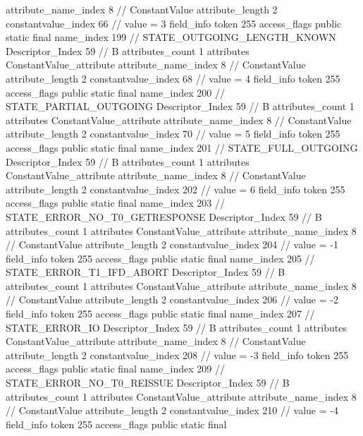 {{{{{{{					attribute_name_index	8		// ConstantValue
					attribute_length	2
					constantvalue_index	66		// value = 3
				}
				}
			}
			field_info {
				token	255
				access_flags	public static final
				name_index	199		// STATE_OUTGOING_LENGTH_KNOWN
				Descriptor_Index	59		// B
				attributes_count	1
				attributes {
				ConstantValue_attribute {
					attribute_name_index	8		// ConstantValue
					attribute_length	2
					constantvalue_index	68		// value = 4
				}
				}
			}
			field_info {
				token	255
				access_flags	public static final
				name_index	200		// STATE_PARTIAL_OUTGOING
				Descriptor_Index	59		// B
				attributes_count	1
				attributes {
				ConstantValue_attribute {
					attribute_name_index	8		// ConstantValue
					attribute_length	2
					constantvalue_index	70		// value = 5
				}
				}
			}
			field_info {
				token	255
				access_flags	public static final
				name_index	201		// STATE_FULL_OUTGOING
				Descriptor_Index	59		// B
				attributes_count	1
				attributes {
				ConstantValue_attribute {
					attribute_name_index	8		// ConstantValue
					attribute_length	2
					constantvalue_index	202		// value = 6
				}
				}
			}
			field_info {
				token	255
				access_flags	public static final
				name_index	203		// STATE_ERROR_NO_T0_GETRESPONSE
				Descriptor_Index	59		// B
				attributes_count	1
				attributes {
				ConstantValue_attribute {
					attribute_name_index	8		// ConstantValue
					attribute_length	2
					constantvalue_index	204		// value = -1
				}
				}
			}
			field_info {
				token	255
				access_flags	public static final
				name_index	205		// STATE_ERROR_T1_IFD_ABORT
				Descriptor_Index	59		// B
				attributes_count	1
				attributes {
				ConstantValue_attribute {
					attribute_name_index	8		// ConstantValue
					attribute_length	2
					constantvalue_index	206		// value = -2
				}
				}
			}
			field_info {
				token	255
				access_flags	public static final
				name_index	207		// STATE_ERROR_IO
				Descriptor_Index	59		// B
				attributes_count	1
				attributes {
				ConstantValue_attribute {
					attribute_name_index	8		// ConstantValue
					attribute_length	2
					constantvalue_index	208		// value = -3
				}
				}
			}
			field_info {
				token	255
				access_flags	public static final
				name_index	209		// STATE_ERROR_NO_T0_REISSUE
				Descriptor_Index	59		// B
				attributes_count	1
				attributes {
				ConstantValue_attribute {
					attribute_name_index	8		// ConstantValue
					attribute_length	2
					constantvalue_index	210		// value = -4
				}
				}
			}
			field_info {
				token	255
				access_flags	public static final
}}}}}
